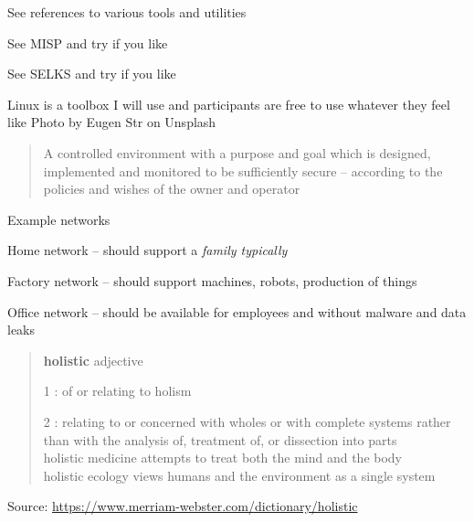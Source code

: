\documentclass[Screen16to9,17pt]{foils}
\begin{document}

\begin{list2}
\item See references to various tools and utilities
\item See MISP and try if you like
\item See SELKS and try if you like
\end{list2}

Linux is a toolbox I will use and participants are free to use whatever they feel like
\hfill Photo by Eugen Str on Unsplash






\begin{quote}
A controlled environment with a purpose and goal which is designed, implemented and monitored to be sufficiently secure -- according to the policies and wishes of the owner and operator
\end{quote}

Example networks
\begin{list2}
\item Home network -- should support a \emph{family typically}
\item Factory network -- should support machines, robots, production of things
\item Office network -- should be available for employees and without malware and data leaks
\end{list2}


\begin{quote}
{\bf\Large holistic} adjective

\begin{list2}
\item[1]: of or relating to holism
\item[2] : relating to or concerned with wholes or with complete systems rather than with the analysis of, treatment of, or dissection into parts\\
holistic medicine attempts to treat both the mind and the body\\
holistic ecology views humans and the environment as a single system
\end{list2}
\end{quote}
Source: \url{https://www.merriam-webster.com/dictionary/holistic}
\end{document}
